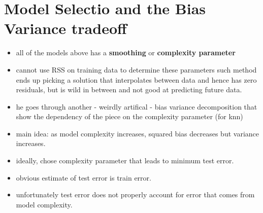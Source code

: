 \documentclass[a4paper]{report}
\newcommand{\<}{\textless}
\renewcommand{\>}{\textgreater}
\begin{document}
\section{Model Selectio and the Bias Variance tradeoff}
\begin{itemize}
  \item all of the models above has a {\bf smoothing} or {\bf complexity parameter}
  \item cannot use RSS on training data to determine these parameters
    \subitem such method ends up picking a solution that interpolates between data and hence has zero residuals, but is wild in between and not good at predicting future data.
  \item he goes through another - weirdly artifical - bias variance decomposition that show the dependency of the piece on the complexity parameter (for knn)
  \item main idea: as model complexity increases, squared bias decreases but variance increases.
  \item ideally, chose complexity parameter that leads to minimum test error.
  \item obvious estimate of test error is train error. 
  \item unfortunately test error does not properly account for error that comes from model complexity.
\end{itemize}
\end{document}

